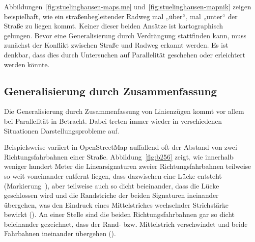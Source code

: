 \documentclass[../main/thesis.tex]{subfiles}
\begin{document}
Abbildungen~\ref{fig:stuelinghausen-maps.me} und~\ref{fig:stuelinghausen-mapnik} zeigen beispielhaft, wie ein straßenbegleitender Radweg mal „über“, mal „unter“ der Straße zu liegen kommt.
Keiner dieser beiden Ansätze ist kartographisch gelungen.
Bevor eine Generalisierung durch Verdrängung stattfinden kann, muss zunächst der Konflikt zwischen Straße und Radweg erkannt werden.
Es ist denkbar, dass dies durch Untersuchen auf Parallelität geschehen oder erleichtert werden könnte.



\subsection{Generalisierung durch Zusammenfassung}

Die Generalisierung durch Zusammenfassung von Linienzügen kommt vor allem bei Parallelität in Betracht.
Dabei treten immer wieder in verschiedenen Situationen Darstellungsprobleme auf.

\label{dual-highway-case-2}

Beispielsweise variiert in OpenStreetMap auffallend oft der Abstand von zwei Richtungsfahrbahnen einer Straße.
Abbildung~\ref{fig:b256} zeigt, wie innerhalb weniger hundert Meter die Linearsignaturen zweier Richtungsfahrbahnen teilweise so weit voneinander entfernt liegen, dass dazwischen eine Lücke entsteht (Markierung~), aber teilweise auch so dicht beieinander, dass die Lücke geschlossen wird und die Randstriche der beiden Signaturen ineinander übergehen, was den Eindruck eines Mittelstriches wechselnder Strichstärke bewirkt ().
An einer Stelle sind die beiden Richtungsfahrbahnen gar so dicht beieinander gezeichnet, dass der Rand- bzw. Mittelstrich verschwindet und beide Fahrbahnen ineinander übergehen ().

\end{document}

